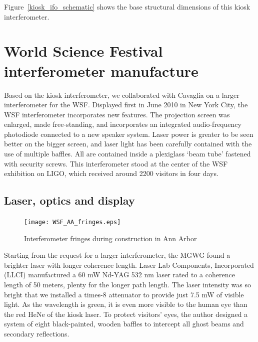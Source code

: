 Figure~\ref{kiosk_ifo_schematic} shows the base structural dimensions of this kiosk interferometer.


    \section{World Science Festival interferometer manufacture}
    \label{manufacture}

    
Based on the kiosk interferometer, we collaborated with Cavaglia on a larger interferometer for the WSF.
Displayed first in June 2010 in New York City, the WSF interferometer incorporates new features.
The projection screen was enlarged, made free-standing,
and incorporates an integrated audio-frequency photodiode connected to a new speaker system.
Laser power is greater to be seen better on the bigger screen, and
laser light has been carefully contained with the use of multiple baffles.
All are contained inside a plexiglass `beam tube' fastened with security screws.
This interferometer stood at the center of the WSF exhibition on LIGO, which received around 2200 visitors in four days.


        \subsection{Laser, optics and display}
        \label{laser_display}


	\begin{figure}
	\begin{center}
	\texttt{[image: WSF\_AA\_fringes.eps]}
	\caption{Interferometer fringes during construction in Ann Arbor}
	\label{WSF_AA_fringes}
	\end{center}
	\end{figure}

Starting from the request for a larger interferometer, the MGWG found a brighter laser with longer coherence length.
Laser Lab Components, Incorporated (LLCI) manufactured a 60 mW Nd-YAG 532 nm laser rated to a coherence length of 50 meters, plenty for the longer path length.
The laser intensity was so bright that we installed a times-8 attenuator to provide just 7.5 mW of visible light.
As the wavelength is green, it is even more visible to the human eye than the red HeNe of the kiosk laser.
To protect visitors' eyes, the author designed a system of eight black-painted, wooden baffles to intercept all ghost beams and secondary reflections.

